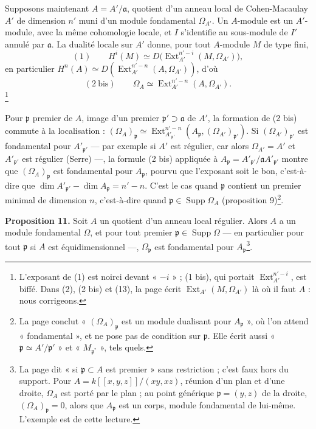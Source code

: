 \documentclass[11pt,a4paper]{article}
\begin{document}
Supposons maintenant $A = A'/\mathfrak{a}$, quotient d'un anneau local de
Cohen-Macaulay $A'$ de dimension $n'$ muni d'un module fondamental
$\Omega_{A'}$. Un $A$-module est un $A'$-module, avec la même cohomologie
locale, et $I$ s'identifie au sous-module de $I'$ annulé par $\mathfrak{a}$. La
dualité locale sur $A'$ donne, pour tout $A$-module $M$ de type fini,
\[
  (1) \qquad H^i(M) \simeq D\bigl(\operatorname{Ext}^{n'-i}_{A'}(M, \Omega_{A'})\bigr),
\]
en particulier $H^n(A) \simeq D(\operatorname{Ext}^{n'-n}_{A'}(A,
\Omega_{A'}))$, d'où
\[
  (2\ \text{bis}) \qquad \Omega_A \simeq \operatorname{Ext}^{n'-n}_{A'}(A, \Omega_{A'}) .
\]
\footnote{L'exposant de (1) est noirci devant « $-i$ » ; (1 bis), qui portait
$\operatorname{Ext}^{n'-i}_{A'}$, est biffé. Dans (2), (2 bis) et (13), la page
écrit $\operatorname{Ext}_{A'}(M, \Omega_{A'})$ là où il faut $A$ : nous
corrigeons.}

Pour $\mathfrak{p}$ premier de $A$, image d'un premier $\mathfrak{p}' \supset
\mathfrak{a}$ de $A'$, la formation de (2 bis) commute à la localisation :
$(\Omega_A)_{\mathfrak{p}} \simeq \operatorname{Ext}^{n'-n}_{A'_{\mathfrak{p}'}}
(A_{\mathfrak{p}}, (\Omega_{A'})_{\mathfrak{p}'})$. Si
$(\Omega_{A'})_{\mathfrak{p}'}$ est fondamental pour $A'_{\mathfrak{p}'}$ --- par
exemple si $A'$ est régulier, car alors $\Omega_{A'} = A'$ et
$A'_{\mathfrak{p}'}$ est régulier (Serre) ---, la formule (2 bis) appliquée à
$A_{\mathfrak{p}} = A'_{\mathfrak{p}'}/\mathfrak{a}A'_{\mathfrak{p}'}$ montre
que $(\Omega_A)_{\mathfrak{p}}$ est fondamental pour $A_{\mathfrak{p}}$, pourvu
que l'exposant soit le bon, c'est-à-dire que $\dim A'_{\mathfrak{p}'} - \dim
A_{\mathfrak{p}} = n' - n$. C'est le cas quand $\mathfrak{p}$ contient un
premier minimal de dimension $n$, c'est-à-dire quand $\mathfrak{p} \in
\operatorname{Supp} \Omega_A$ (proposition 9)\footnote{La page conclut
« $(\Omega_A)_{\mathfrak{p}}$ est un module dualisant pour $A_{\mathfrak{p}}$ »,
où l'on attend « fondamental », et ne pose pas de condition sur
$\mathfrak{p}$. Elle écrit aussi « $\mathfrak{p} \simeq A'/\mathfrak{p}'$ » et
« $M_{\mathfrak{p}^*}$ », tels quels.}.

\textbf{Proposition 11.} Soit $A$ un quotient d'un anneau local régulier.
Alors $A$ a un module fondamental $\Omega$, et pour tout premier $\mathfrak{p}
\in \operatorname{Supp} \Omega$ --- en particulier pour tout $\mathfrak{p}$ si
$A$ est équidimensionnel ---, $\Omega_{\mathfrak{p}}$ est fondamental pour
$A_{\mathfrak{p}}$\footnote{La page dit « si $\mathfrak{p} \subset A$ est
premier » sans restriction ; c'est faux hors du support. Pour $A =
k[[x,y,z]]/(xy, xz)$, réunion d'un plan et d'une droite, $\Omega_A$ est porté
par le plan ; au point générique $\mathfrak{p} = (y, z)$ de la droite,
$(\Omega_A)_{\mathfrak{p}} = 0$, alors que $A_{\mathfrak{p}}$ est un corps,
module fondamental de lui-même. L'exemple est de cette lecture.}.
\end{document}
